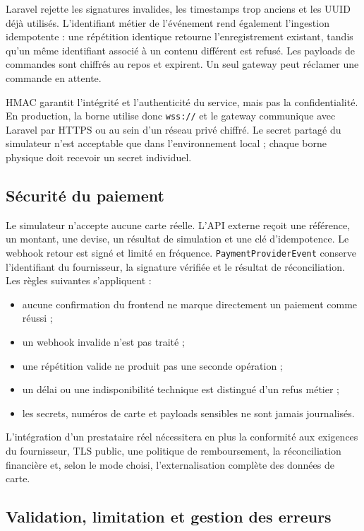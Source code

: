 Laravel rejette les signatures invalides, les timestamps trop anciens et les UUID
déjà utilisés. L'identifiant métier de l'événement rend également l'ingestion
idempotente : une répétition identique retourne l'enregistrement existant, tandis
qu'un même identifiant associé à un contenu différent est refusé. Les payloads de
commandes sont chiffrés au repos et expirent. Un seul gateway peut réclamer une
commande en attente.

HMAC garantit l'intégrité et l'authenticité du service, mais pas la confidentialité.
En production, la borne utilise donc \texttt{wss://} et le gateway communique avec
Laravel par HTTPS ou au sein d'un réseau privé chiffré. Le secret partagé du
simulateur n'est acceptable que dans l'environnement local ; chaque borne physique
doit recevoir un secret individuel.

\subsection{Sécurité du paiement}

Le simulateur n'accepte aucune carte réelle. L'API externe reçoit une référence, un
montant, une devise, un résultat de simulation et une clé d'idempotence. Le webhook
retour est signé et limité en fréquence. \texttt{PaymentProviderEvent} conserve
l'identifiant du fournisseur, la signature vérifiée et le résultat de
réconciliation. Les règles suivantes s'appliquent :

\begin{itemize}[leftmargin=7mm]
  \item aucune confirmation du frontend ne marque directement un paiement comme
  réussi ;
  \item un webhook invalide n'est pas traité ;
  \item une répétition valide ne produit pas une seconde opération ;
  \item un délai ou une indisponibilité technique est distingué d'un refus métier ;
  \item les secrets, numéros de carte et payloads sensibles ne sont jamais journalisés.
\end{itemize}

L'intégration d'un prestataire réel nécessitera en plus la conformité aux exigences
du fournisseur, TLS public, une politique de remboursement, la réconciliation
financière et, selon le mode choisi, l'externalisation complète des données de carte.

\subsection{Validation, limitation et gestion des erreurs}

